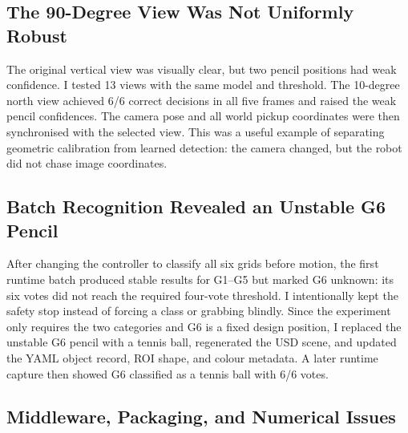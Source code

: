\documentclass[12pt,a4paper]{article}
\begin{document}
\subsection{The 90-Degree View Was Not Uniformly Robust}

The original vertical view was visually clear, but two pencil positions had weak confidence. I tested 13 views with the same model and threshold. The 10-degree north view achieved 6/6 correct decisions in all five frames and raised the weak pencil confidences. The camera pose and all world pickup coordinates were then synchronised with the selected view. This was a useful example of separating geometric calibration from learned detection: the camera changed, but the robot did not chase image coordinates.

\subsection{Batch Recognition Revealed an Unstable G6 Pencil}

After changing the controller to classify all six grids before motion, the first runtime batch produced stable results for G1--G5 but marked G6 unknown: its six votes did not reach the required four-vote threshold. I intentionally kept the safety stop instead of forcing a class or grabbing blindly. Since the experiment only requires the two categories and G6 is a fixed design position, I replaced the unstable G6 pencil with a tennis ball, regenerated the USD scene, and updated the YAML object record, ROI shape, and colour metadata. A later runtime capture then showed G6 classified as a tennis ball with 6/6 votes.

\subsection{Middleware, Packaging, and Numerical Issues}
\end{document}
